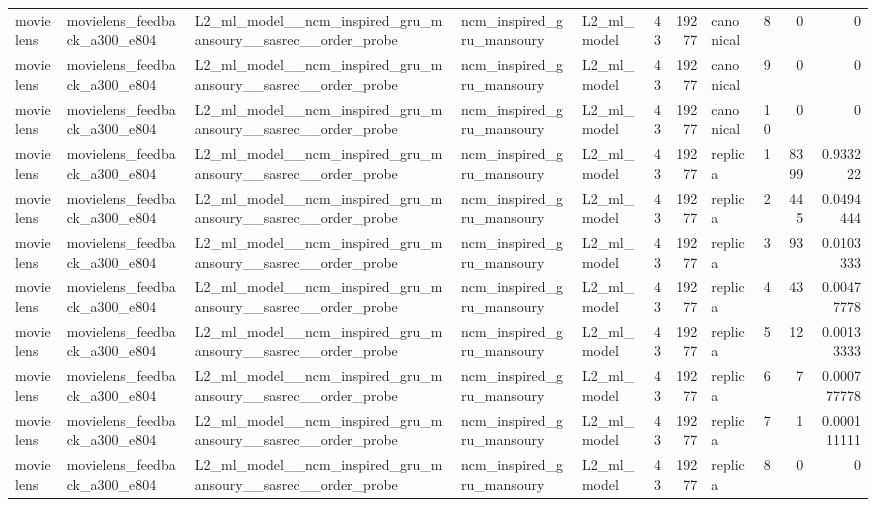 \begin{table}[htbp!]
\begin{tabular}{lllllrrlrrr}
movielens & movielens\_feedback\_a300\_e804 & L2\_ml\_model\_\_ncm\_inspired\_gru\_mansoury\_\_sasrec\_\_order\_probe & ncm\_inspired\_gru\_mansoury & L2\_ml\_model & 43 & 19277 & canonical & 8 & 0 & 0 \\
movielens & movielens\_feedback\_a300\_e804 & L2\_ml\_model\_\_ncm\_inspired\_gru\_mansoury\_\_sasrec\_\_order\_probe & ncm\_inspired\_gru\_mansoury & L2\_ml\_model & 43 & 19277 & canonical & 9 & 0 & 0 \\
movielens & movielens\_feedback\_a300\_e804 & L2\_ml\_model\_\_ncm\_inspired\_gru\_mansoury\_\_sasrec\_\_order\_probe & ncm\_inspired\_gru\_mansoury & L2\_ml\_model & 43 & 19277 & canonical & 10 & 0 & 0 \\
movielens & movielens\_feedback\_a300\_e804 & L2\_ml\_model\_\_ncm\_inspired\_gru\_mansoury\_\_sasrec\_\_order\_probe & ncm\_inspired\_gru\_mansoury & L2\_ml\_model & 43 & 19277 & replica & 1 & 8399 & 0.933222 \\
movielens & movielens\_feedback\_a300\_e804 & L2\_ml\_model\_\_ncm\_inspired\_gru\_mansoury\_\_sasrec\_\_order\_probe & ncm\_inspired\_gru\_mansoury & L2\_ml\_model & 43 & 19277 & replica & 2 & 445 & 0.0494444 \\
movielens & movielens\_feedback\_a300\_e804 & L2\_ml\_model\_\_ncm\_inspired\_gru\_mansoury\_\_sasrec\_\_order\_probe & ncm\_inspired\_gru\_mansoury & L2\_ml\_model & 43 & 19277 & replica & 3 & 93 & 0.0103333 \\
movielens & movielens\_feedback\_a300\_e804 & L2\_ml\_model\_\_ncm\_inspired\_gru\_mansoury\_\_sasrec\_\_order\_probe & ncm\_inspired\_gru\_mansoury & L2\_ml\_model & 43 & 19277 & replica & 4 & 43 & 0.00477778 \\
movielens & movielens\_feedback\_a300\_e804 & L2\_ml\_model\_\_ncm\_inspired\_gru\_mansoury\_\_sasrec\_\_order\_probe & ncm\_inspired\_gru\_mansoury & L2\_ml\_model & 43 & 19277 & replica & 5 & 12 & 0.00133333 \\
movielens & movielens\_feedback\_a300\_e804 & L2\_ml\_model\_\_ncm\_inspired\_gru\_mansoury\_\_sasrec\_\_order\_probe & ncm\_inspired\_gru\_mansoury & L2\_ml\_model & 43 & 19277 & replica & 6 & 7 & 0.000777778 \\
movielens & movielens\_feedback\_a300\_e804 & L2\_ml\_model\_\_ncm\_inspired\_gru\_mansoury\_\_sasrec\_\_order\_probe & ncm\_inspired\_gru\_mansoury & L2\_ml\_model & 43 & 19277 & replica & 7 & 1 & 0.000111111 \\
movielens & movielens\_feedback\_a300\_e804 & L2\_ml\_model\_\_ncm\_inspired\_gru\_mansoury\_\_sasrec\_\_order\_probe & ncm\_inspired\_gru\_mansoury & L2\_ml\_model & 43 & 19277 & replica & 8 & 0 & 0 \\

\end{tabular}
\end{table}
